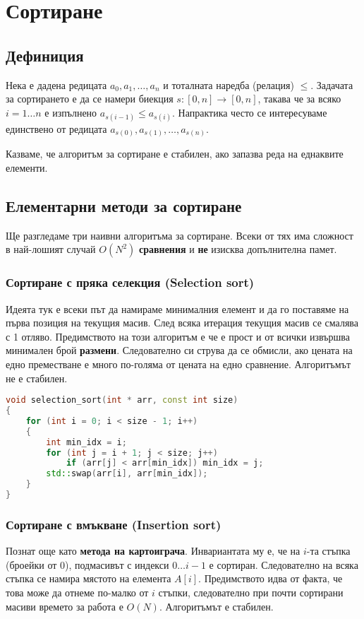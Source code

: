 \documentclass[fleqn,12pt]{article}
\begin{document}
\section{Сортиране}
\subsection{Дефиниция}
Нека е дадена редицата $a_0, a_1, \dots, a_n$ и тоталната наредба (релация) $\leq$.
Задачата за сортирането е да се намери биекция $s : [0, n] \rightarrow [0, n]$, такава че 
за всяко $i = 1 \dots n$ е изпълнено $a_{s(i - 1)} \leq a_{s(i)}$.
Напрактика често се интересуваме единствено от редицата $a_{s(0)}, a_{s(1)}, \dots, a_{s(n)}$.

Казваме, че алгоритъм за сортиране е стабилен, ако запазва реда на еднаквите елементи.

\subsection{Елементарни методи за сортиране}
Ще разгледаме три наивни алгоритъма за сортиране. Всеки от тях има сложност в най-лошият случай $O(N^2)$ \textbf{сравнения} 
и \textbf{не} изисква допълнителна памет.

\subsubsection{Сортиране с пряка селекция (Selection sort)}
Идеята тук е всеки път да намираме минималния елемент и да го поставяме на първа позиция на текущия масив.
След всяка итерация текущия масив се смалява с 1 отляво. Предимството на този алгоритъм е че е прост и от всички
извършва минимален брой \textbf{размени}. Следователно си струва да се обмисли, ако цената на едно преместване е
много по-голяма от цената на едно сравнение. Алгоритъмът не е стабилен.

\begin{lstlisting}[language=C++, caption=Selection sort]
void selection_sort(int * arr, const int size)
{
    for (int i = 0; i < size - 1; i++)
    {
        int min_idx = i;
        for (int j = i + 1; j < size; j++) 
            if (arr[j] < arr[min_idx]) min_idx = j;
        std::swap(arr[i], arr[min_idx]);
    }
}
\end{lstlisting}

\subsubsection{Сортиране с вмъкване (Insertion sort)}
\label{sort:insertion}
Познат още като \textbf{метода на картоиграча}. Инвариантата му е, че на $i$-та стъпка (броейки от 0), подмасивът 
с индекси $0 \dots i - 1$ е сортиран. Следователно на всяка стъпка се намира мястото на елемента $A[i]$. 
Предимството идва от факта, че това може да отнеме по-малко от $i$ стъпки, следователно при почти сортирани масиви
времето за работа е $O(N)$. Алгоритъмът е стабилен.
\end{document}
